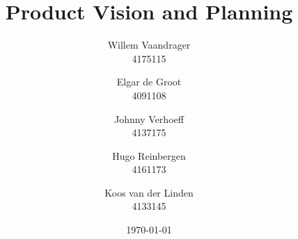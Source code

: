 \begin{titlepage}
\title{Product Vision and Planning}
\author{Willem Vaandrager\\ 4175115 
\and Elgar de Groot\\ 4091108 
\and Johnny Verhoeff\\ 4137175 
\and Hugo Reinbergen\\ 4161173 
\and Koos van der Linden\\ 4133145}
\date{\today }
\maketitle
\end{titlepage}